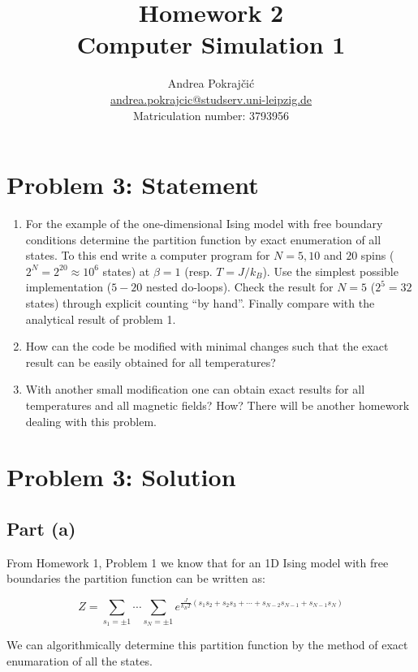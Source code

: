 ﻿\documentclass[11pt]{article}
\title{Homework 2\\[0.5ex]\large Computer Simulation 1}
\author{Andrea Pokraj\v{c}i\'{c}\\
    \normalsize\href{mailto:andrea.pokrajcic@studserv.uni-leipzig.de}{andrea.pokrajcic@studserv.uni-leipzig.de}\\
    \normalsize Matriculation number: 3793956}
\date{}
\begin{document}
    
    \maketitle
    
    

    
    \section*{Problem 3: Statement}\label{problem-3-statement}

\begin{enumerate}
\def\labelenumi{\alph{enumi})}
\item
  For the example of the one-dimensional Ising model with free boundary
  conditions determine the partition function by exact enumeration of
  all states. To this end write a computer program for \(N = 5, 10\) and
  \(20\) spins (\(2^N = 2^{20} \approx 10^6\) states) at \(\beta=1\)
  (resp. \(T = J/k_B\)). Use the simplest possible implementation
  (\(5-20\) nested do-loops). Check the result for \(N = 5\)
  (\(2^5 = 32\) states) through explicit counting ``by hand''. Finally
  compare with the analytical result of problem 1.
\item
  How can the code be modified with minimal changes such that the exact
  result can be easily obtained for all temperatures?
\item
  With another small modification one can obtain exact results for all
  temperatures and all magnetic fields? How? There will be another
  homework dealing with this problem.
\end{enumerate}

    \section*{Problem 3: Solution}\label{problem-3-solution}

    \subsection*{Part (a)}

From Homework 1, Problem 1 we know that for an 1D Ising model with free
boundaries the partition function can be written as:

\[
Z=\sum_{s_1=\pm1}\cdots\sum_{s_N=\pm1}e^{\frac{J}{k_B T}(s_1s_2+s_2s_3+\cdots+s_{N-2}s_{N-1}+s_{N-1}s_N)} \tag{1}
\]

We can algorithmically determine this partition function by the method
of exact enumaration of all the states.
\end{document}

